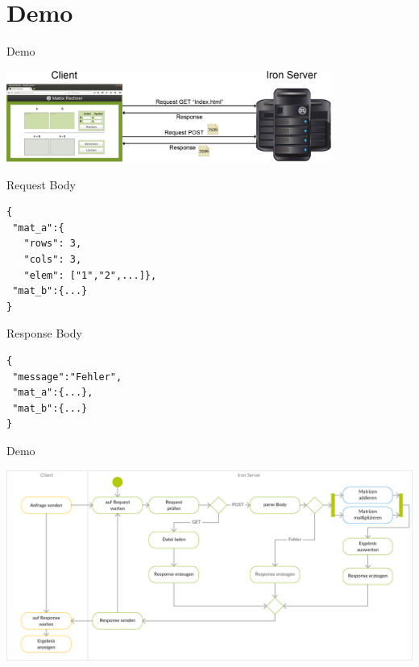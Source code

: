 \documentclass{beamer}
\begin{document}
\section{Demo}
\begin{frame}[fragile]{Demo}
\begin{center}
\includegraphics[width=0.8\textwidth]{uebersicht.png}
\vspace{1cm}
\pause
\begin{minipage}[t]{.4\textwidth}
{\scriptsize Request Body}
\begin{lstlisting}
{
 "mat_a":{
   "rows": 3,
   "cols": 3,
   "elem": ["1","2",...]},
 "mat_b":{...}
}
\end{lstlisting}				
\end{minipage}
\hspace{2cm}
\begin{minipage}[t]{.3\textwidth}
{\scriptsize Response Body}
\begin{lstlisting}
{
 "message":"Fehler",
 "mat_a":{...},
 "mat_b":{...}
}
\end{lstlisting}				
\end{minipage}

\end{center}
\end{frame}
\begin{frame}{Demo}
\begin{center}
\includegraphics[width=\textwidth]{Iron_Server.png}
\end{center}
\end{frame}
\end{document}
